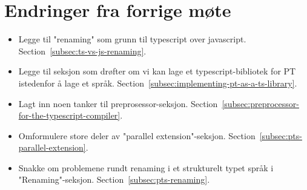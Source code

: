 
\chapter*{Endringer fra forrige møte}

\begin{itemize}
    \item Legge til "renaming" som grunn til typescript over javascript.
    Section~\vref{subsec:ts-vs-js-renaming}.
    \item Legge til seksjon som drøfter om vi kan lage et typescript-bibliotek for PT istedenfor å lage et språk.
    Section~\vref{subsec:implementing-pt-as-a-ts-library}.
    \item Lagt inn noen tanker til preprosessor-seksjon.
    Section~\vref{subsec:preprocessor-for-the-typescript-compiler}.
    \item Omformulere store deler av "parallel extension"-seksjon.
    Section~\vref{subsec:pts-parallel-extension}.
    \item Snakke om problemene rundt renaming i et strukturelt typet språk i "Renaming"-seksjon.
    Section~\vref{subsec:pts-renaming}.
\end{itemize}

